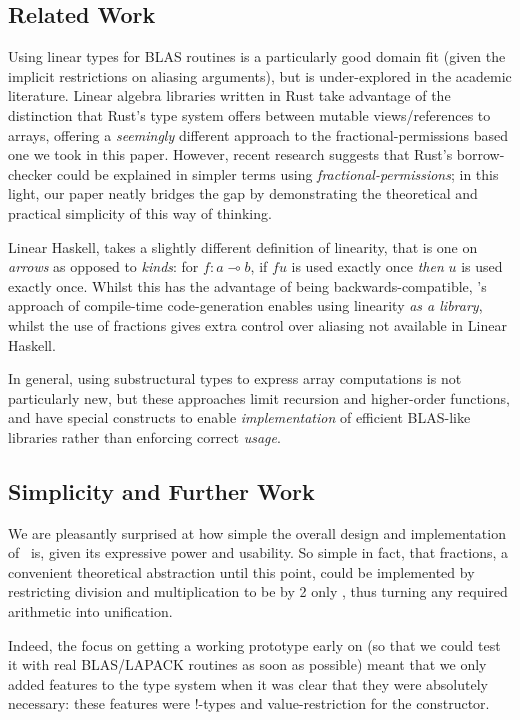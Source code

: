 \subsection{Related Work}

Using linear types for BLAS routines is a particularly good domain fit (given
the implicit restrictions on aliasing arguments), but is under-explored in the
academic literature. Linear algebra libraries written in Rust take advantage of
the distinction that Rust's type system offers between mutable views/references
to arrays, offering a \emph{seemingly} different approach to the
fractional-permissions based one we took in this paper.  However, recent
research\cite{weiss} suggests that Rust's borrow-checker could be explained in
simpler terms using \emph{fractional-permissions}; in this light, our paper
neatly bridges the gap by demonstrating the theoretical and practical
simplicity of this way of thinking.

Linear Haskell\cite{bernardy2017linear}, takes a slightly different definition
of linearity, that is one on \emph{arrows} as opposed to \emph{kinds}: for $f :
a \multimap b$, if $f u$ is used exactly once \emph{then} $u$ is used exactly
once. Whilst this has the advantage of being backwards-compatible, \lang's
approach of compile-time code-generation enables using linearity \emph{as a
library}, whilst the use of fractions gives extra control over aliasing not
available in Linear Haskell.

In general, using substructural types to express array computations is not
particularly new\cite{scholz,henriksen,bernardy2016}, but these approaches
limit recursion and higher-order functions, and have special constructs to
enable \emph{implementation} of efficient BLAS-like libraries rather than
enforcing correct \emph{usage}.

\subsection{Simplicity and Further Work}

We are pleasantly surprised at how simple the overall design and implementation
of \lang\ is, given its expressive power and usability.  So simple in fact,
that fractions, a convenient theoretical abstraction until this point, could be
implemented by restricting division and multiplication to be by 2 only
\cite{boyland2003}, thus turning any required arithmetic into unification.

Indeed, the focus on getting a working prototype early on (so that we could
test it with real BLAS/LAPACK routines as soon as possible) meant that we only
added features to the type system when it was clear that they were absolutely
necessary: these features were !-types and value-restriction for the
 constructor. 


